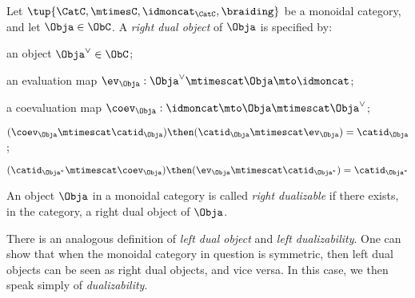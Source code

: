 \begin{ctdefinition}\label{def:dualizable-object}
Let $\tup{\CatC,\mtimesC,\idmoncat_{\CatC}, \braiding}$ be a monoidal category, and let $\Obja \in \ObC$. A \emph{right dual object} of $\Obja$ is specified by:

\constit
\begin{compactenum}
\item an object $\Obja^\vee \in \ObC$;
\item an evaluation map $\ev_\Obja: \Obja^\vee \mtimescat \Obja \mto \idmoncat$; 
\item a coevaluation map $\coev_\Obja: \idmoncat \mto \Obja \mtimescat \Obja^\vee$;
\end{compactenum}

\condit
\begin{compactenum}
\item $(\coev_\Obja \mtimescat \catid_\Obja) \then (\catid_\Obja \mtimescat \ev_\Obja) = \catid_\Obja$; 
\item $(\catid_{\Obja^*} \mtimescat \coev_\Obja)  \then (\ev_\Obja \mtimescat \catid_{\Obja^*})  = \catid_{\Obja^*}$

\end{compactenum}
\end{ctdefinition}

\begin{definition}
An object $\Obja$ in a monoidal category is called \emph{right dualizable} if there exists, in the category, a right dual object of $\Obja$. 
\end{definition}

\begin{remark}
There is an analogous definition of \emph{left dual object} and \emph{left dualizability}. One can show that when the monoidal category in question is symmetric, then left dual objects can be seen as right dual objects, and vice versa. In this case, we then speak simply of \emph{dualizability}. 
\end{remark}



